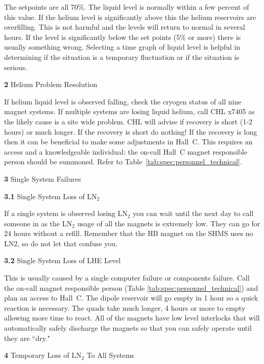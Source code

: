 {\begin{description}
\item{}\hskip0.3in The setpoints are all 70\%.  The liquid
level is normally within a few percent of this value.  If
the helium level is significantly above this
the helium reservoirs are overfilling.  This is not harmful and the
levels will return to normal in several hours.  If the level is
significantly below the set points (5\% or more) there is usually
something wrong.  Selecting a time graph of liquid level is helpful in
determining if the situation is a temporary fluctuation or if the
situation is serious.
\item{\bf 2}\hskip0.1in Helium Problem Resolution
\item{}\hskip0.3in If helium liquid level is observed falling, check the cryogen status of all nine magnet
systems.  If multiple systems are losing liquid helium,  call CHL x7405 as the
likely cause is a site wide problem.  CHL will advise if recovery is
short (1-2 hours) or much longer.  If the recovery is short do nothing!
If the recovery is long then it can be beneficial to make some
adjustments in Hall~C.  This requires an access and a knowledgeable
individual: the on-call Hall~C magnet responsible person
should be summoned. Refer to Table~\ref{tab:spec:personnel_technical}.
\item{\bf 3}\hskip0.1in Single System Failures
\item{\bf 3.1}\hskip0.1in Single System Loss of LN$_2$
\item{}\hskip0.3in If a single system is observed losing LN$_2$ you can
wait until
the next day to call someone in as the LN$_2$ usage of all the magnets
is extremely low.  They can go for 24 hours without a refill. Remember that the
HB magnet on the SHMS uses no LN2, so do not let that confuse you.
\item{\bf 3.2}\hskip0.1in Single System Loss of LHE Level
\item{}\hskip0.3in This is usually caused by a single computer failure or
components failure.  Call the on-call magnet responsible person (Table \ref{tab:spec:personnel_technical})
and plan an access to Hall~C. The dipole reservoir will go empty in 1 hour so a quick reaction is
necessary.  The quads take much longer, 4 hours or more to empty
allowing more time to react.  All of the magnets have low level
interlocks that will automatically safely discharge the magnets
so that you can safely operate until they are ``dry."
\item{\bf 4}\hskip0.1in Temporary Loss of LN$_2$ To All Systems

\end{description}}
